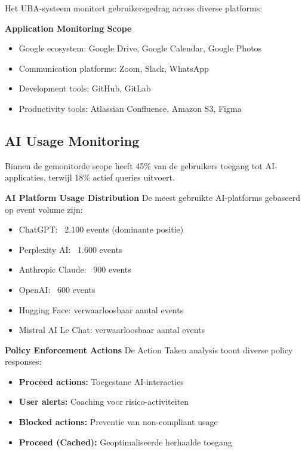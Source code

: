 \vspace{2ex}

Het UBA-systeem monitort gebruikersgedrag across diverse platforms:

\textbf{Application Monitoring Scope}
\begin{itemize}
    \item Google ecosystem: Google Drive, Google Calendar, Google Photos
    \item Communication platforms: Zoom, Slack, WhatsApp
    \item Development tools: GitHub, GitLab
    \item Productivity tools: Atlassian Confluence, Amazon S3, Figma
\end{itemize}

\subsection{AI Usage Monitoring}
Binnen de gemonitorde scope heeft 45\% van de gebruikers toegang tot AI-applicaties, terwijl 18\% actief queries uitvoert.

\vspace{2ex}

\textbf{AI Platform Usage Distribution}
De meest gebruikte AI-platforms gebaseerd op event volume zijn:
\begin{itemize}
    \item ChatGPT: ~2.100 events (dominante positie)
    \item Perplexity AI: ~1.600 events
    \item Anthropic Claude: ~900 events
    \item OpenAI: ~600 events
    \item Hugging Face: verwaarloosbaar aantal events
    \item Mistral AI Le Chat: verwaarloosbaar aantal events
\end{itemize}

\vspace{2ex}

\textbf{Policy Enforcement Actions}
De Action Taken analysis toont diverse policy responses:
\begin{itemize}
    \item \textbf{Proceed actions:} Toegestane AI-interacties
    \item \textbf{User alerts:} Coaching voor risico-activiteiten
    \item \textbf{Blocked actions:} Preventie van non-compliant usage
    \item \textbf{Proceed (Cached):} Geoptimaliseerde herhaalde toegang
\end{itemize}

